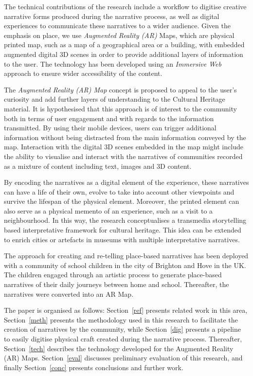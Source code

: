 \documentclass[acmlarge,screen,dvipsnames]{acmart}
\begin{document}
The technical contributions of the research include a workflow to digitise creative narrative forms produced during the narrative process, as well as digital experiences  to communicate these narratives to a wider audience. Given the emphasis on place, we use \emph{Augmented Reality (AR)} Maps, which are physical printed
map, such as a map of a geographical area or a building, with embedded
augmented digital 3D scenes in order to provide additional layers of
information to the user. The technology has been developed using an
\emph{Immersive Web} approach to ensure wider accessibility of the content.

The \emph{Augmented Reality (AR) Map} concept is proposed to appeal to the
user's curiosity and add further layers of understanding to the Cultural
Heritage material. It is hypothesised that this approach is of interest to the
community both in terms of user engagement and with regards to the information
transmitted. By using their mobile devices, users can trigger additional
information without being distracted from the main information conveyed by the
map. Interaction with the digital 3D scenes embedded in the map might include
the ability to visualise and interact with the narratives of communities
recorded as a mixture of content including text, images and 3D content. 

By encoding the narratives as a digital element of the experience, these
narratives can have a life of their own, evolve to take into account other
viewpoints and survive the lifespan of the physical element. Moreover, the
printed element can also serve as a physical memento of an experience, such as
a visit to a neighbourhood. In this way, the research conceptualises a
transmedia storytelling based interpretative framework for cultural heritage.
This idea can be extended to enrich cities or artefacts in museums with
multiple interpretative narratives.

The approach for creating and re-telling place-based narratives has been
deployed with a community of school children in the city of Brighton and Hove
in the UK. The children engaged through an artistic process to generate
place-based narratives of their daily journeys between home and school.
Thereafter, the narratives were converted into an AR Map.

The paper is organised as follows: Section~\ref{ref} presents related work in
this area, Section~\ref{meth} presents the methodology used in this research
to facilitate the creation of narratives by the community, while
Section~\ref{dig} presents a pipeline to easily digitise physical craft created during the narrative process. Thereafter, Section~\ref{tech} describes the technology developed for the Augmented
Reality (AR) Maps. Section~\ref{eval} discusses preliminary evaluation of this
research, and finally Section~\ref{conc} presents conclusions and further
work.
\end{document}
